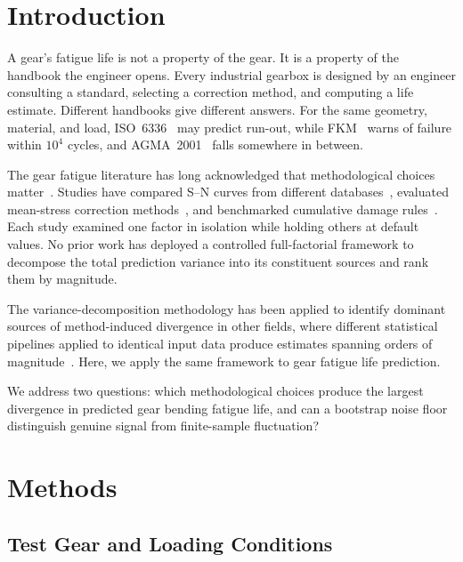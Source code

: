 \documentclass[12pt,a4paper]{article}
\begin{document}
\section{Introduction}
\label{sec:intro}

A gear's fatigue life is not a property of the gear. It is a property
of the handbook the engineer opens. Every industrial gearbox is designed
by an engineer consulting a standard, selecting a correction method, and
computing a life estimate. Different handbooks give different answers.
For the same geometry, material, and load, ISO~6336~\cite{iso6336} may
predict run-out, while FKM~\cite{fkm} warns of failure within $10^4$
cycles, and AGMA~2001~\cite{agma2001} falls somewhere in between.

The gear fatigue literature has long acknowledged that methodological
choices matter~\cite{stephens2001, dowling2013}. Studies have compared
S--N curves from different databases~\cite{waterloo_fde}, evaluated
mean-stress correction methods~\cite{dowling2009}, and benchmarked
cumulative damage rules~\cite{fatemi1998}. Each study examined one
factor in isolation while holding others at default values. No prior
work has deployed a controlled full-factorial framework to decompose
the total prediction variance into its constituent sources and rank
them by magnitude.

The variance-decomposition methodology has been applied to identify
dominant sources of method-induced divergence in other fields, where
different statistical pipelines applied to identical input data produce
estimates spanning orders of magnitude~\cite{chen2026etaearth}. Here,
we apply the same framework to gear fatigue life prediction.

We address two questions: which methodological choices produce the
largest divergence in predicted gear bending fatigue life, and can a
bootstrap noise floor distinguish genuine signal from finite-sample
fluctuation?

\section{Methods}
\label{sec:methods}

\subsection{Test Gear and Loading Conditions}
\end{document}
